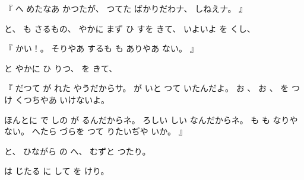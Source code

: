 %
『
へ
めたなあ
かつたが、
%
つてた
ばかりだわナ、
%
しねえナ。%
』

%
と、
%
も
さるもの、
%
やかに
まず
ひ
すを
きて、
%
いよいよ%
を
くし、

%
『
かい！。
%
そりやあ
するも%
も
ありやあ
ない。
』

%
と
やかに
ひ
りつ、
%
を
きて、

%
『
だつて
が
れた
やうだからサ。
%
が
いと
つて
いたんだよ。
%
お
、
%
お
、
%
を
つけ
くつちやあ
いけないよ。

%
ほんとに
で
しの
が
るんだからネ。
%
ろしい
しい
なんだからネ。
%
も
も
なりや
ない。
%
へたら
づらを
つて
りたいぢや
いか。
』

%
と、
%
ひながら
の
へ、
%
むずと
つたり。

%
は
じたる
に
して
を
けり。
